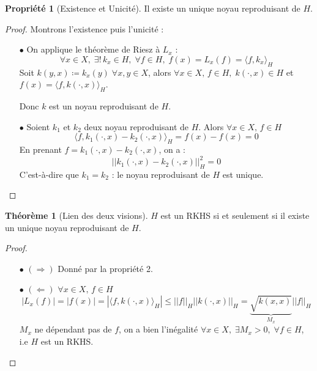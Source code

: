 \documentclass[a4paper, 11pt, french]{article}
\theoremstyle{definition}
\newtheorem{theorem}{Théorème}
\newtheorem{property}{Propriété}
\begin{document}
	\begin{property}[Existence et Unicité]
		Il existe un unique noyau reproduisant de $H$.
	\end{property}
	\begin{proof}
		Montrons l'existence puis l'unicité : \\
		\begin{itemize}
			\item[$\bullet$]
			On applique le théorème de Riesz à $L_x$ :
			\[\forall x \in X, \; \exists ! \, k_x \in H, \; \forall f \in H, \; f(x) = L_x (f) = \langle f, k_x \rangle_H\]
			Soit $k(y, x) \coloneqq k_x(y) \; \forall x,y \in X$, alors $\forall x \in X, \, f \in H, \; k(\cdot, x) \in H$ et  $f(x) = \langle f, k(\cdot, x) \rangle_H$.
			
			Donc $k$ est un noyau reproduisant de $H$.
			
			\item[$\bullet$]
			Soient $k_1$ et $k_2$ deux noyau reproduisant de $H$. Alors $\forall x \in X, \, f \in H$
			\[\langle f, k_1(\cdot, x) - k_2(\cdot, x) \rangle_H = f(x) - f(x) = 0\]
			En prenant $f = k_1(\cdot, x) - k_2(\cdot, x)$, on a :
			\[\left|\left| k_1(\cdot, x) - k_2(\cdot, x) \right|\right|_H^2 = 0\]
			C'est-à-dire que $k_1 = k_2$ : le noyau reproduisant de $H$ est unique.
		\end{itemize}
	\end{proof}

	\begin{theorem}[Lien des deux visions]
		$H$ est un RKHS si et seulement si il existe un unique noyau reproduisant de $H$.
	\end{theorem}
	\begin{proof}
		\begin{itemize}
			\item[$\bullet$] $(\Rightarrow)$
				Donné par la propriété 2.
			\item[$\bullet$] $(\Leftarrow)$ $\forall x \in X, \, f \in H$
				\[|L_x(f)| = |f(x)| = |\langle f, k(\cdot, x) \rangle_H| \leq ||f||_H ||k(\cdot,x)||_H = \underbrace{\sqrt{k(x,x)}}_{\text{$M_x$}} ||f||_H\]
				$M_x$ ne dépendant pas de $f$, on a bien l'inégalité $\forall x \in X, \;  \exists M_x > 0, \; \forall f \in H$, i.e $H$ est un RKHS.
		\end{itemize}
	\end{proof}
	
\end{document}
